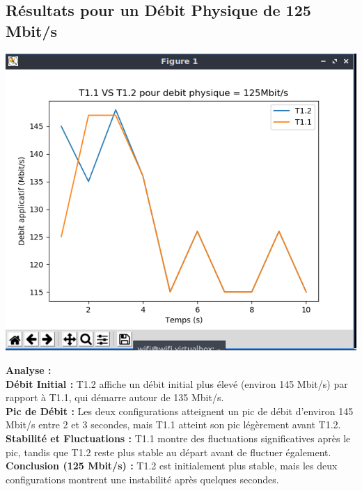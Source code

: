 \subsection{Résultats pour un Débit Physique de 125 Mbit/s}
\begin{center}
    \includegraphics[width=1\textwidth]{./images/T1vsT2pour125.png}
\end{center}
\textbf{Analyse :}\\
\textbf{Débit Initial :} T1.2 affiche un débit initial plus élevé (environ 145 Mbit/s) par rapport à T1.1, qui démarre autour de 135 Mbit/s.\\
\textbf{Pic de Débit :} Les deux configurations atteignent un pic de débit d'environ 145 Mbit/s entre 2 et 3 secondes, mais T1.1 atteint son pic légèrement avant T1.2.\\
\textbf{Stabilité et Fluctuations :} T1.1 montre des fluctuations significatives après le pic, tandis que T1.2 reste plus stable au départ avant de fluctuer également.\\
\textbf{Conclusion (125 Mbit/s) :} T1.2 est initialement plus stable, mais les deux configurations montrent une instabilité après quelques secondes.

